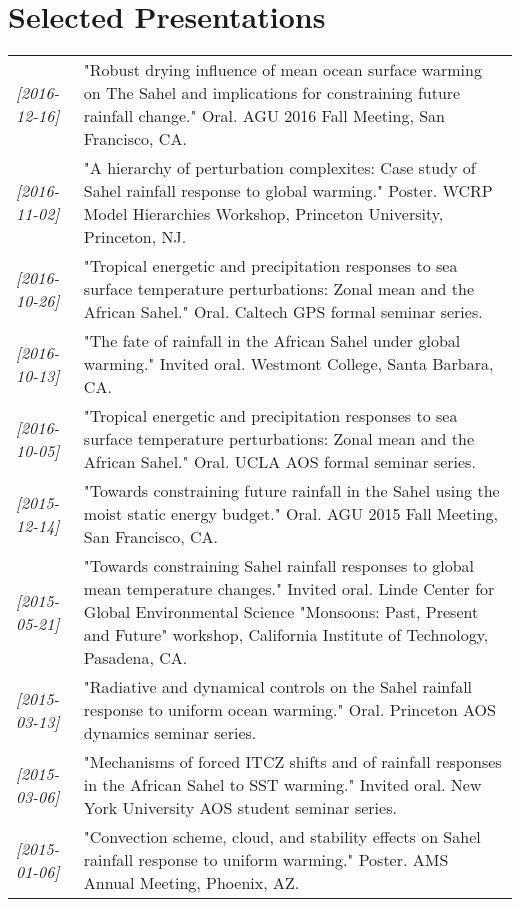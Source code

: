 \documentclass[12pt,letterpaper]{article}
\begin{document}
\section*{Selected Presentations}
\label{sec:org71cee23}
\begin{center}
\begin{tabularx}{\textwidth}{lX}
\textit{[2016-12-16]} & "Robust drying influence of mean ocean surface warming on The Sahel and implications for constraining future rainfall change."  Oral.  AGU 2016 Fall Meeting, San Francisco, CA.\\
\textit{[2016-11-02]} & "A hierarchy of perturbation complexites: Case study of Sahel rainfall response to global warming."  Poster.  WCRP Model Hierarchies Workshop, Princeton University, Princeton, NJ.\\
\textit{[2016-10-26]} & "Tropical energetic and precipitation responses to sea surface temperature perturbations: Zonal mean and the African Sahel."  Oral.  Caltech GPS formal seminar series.\\
\textit{[2016-10-13]} & "The fate of rainfall in the African Sahel under global warming."  Invited oral.  Westmont College, Santa Barbara, CA.\\
\textit{[2016-10-05]} & "Tropical energetic and precipitation responses to sea surface temperature perturbations: Zonal mean and the African Sahel."  Oral.  UCLA AOS formal seminar series.\\
\textit{[2015-12-14]} & "Towards constraining future rainfall in the Sahel using the moist static energy budget." Oral.  AGU 2015 Fall Meeting, San Francisco, CA.\\
\textit{[2015-05-21]} & "Towards constraining Sahel rainfall responses to global mean temperature changes."  Invited oral.  Linde Center for Global Environmental Science "Monsoons: Past, Present and Future" workshop, California Institute of Technology, Pasadena, CA.\\
\textit{[2015-03-13]} & "Radiative and dynamical controls on the Sahel rainfall response to uniform ocean warming."  Oral.  Princeton AOS dynamics seminar series.\\
\textit{[2015-03-06]} & "Mechanisms of forced ITCZ shifts and of rainfall responses in the African Sahel to SST warming."  Invited oral.  New York University AOS student seminar series.\\
\textit{[2015-01-06]} & "Convection scheme, cloud, and stability effects on Sahel rainfall response to uniform warming."  Poster.  AMS Annual Meeting, Phoenix, AZ.\\

\end{tabularx}
\end{center}
\end{document}
